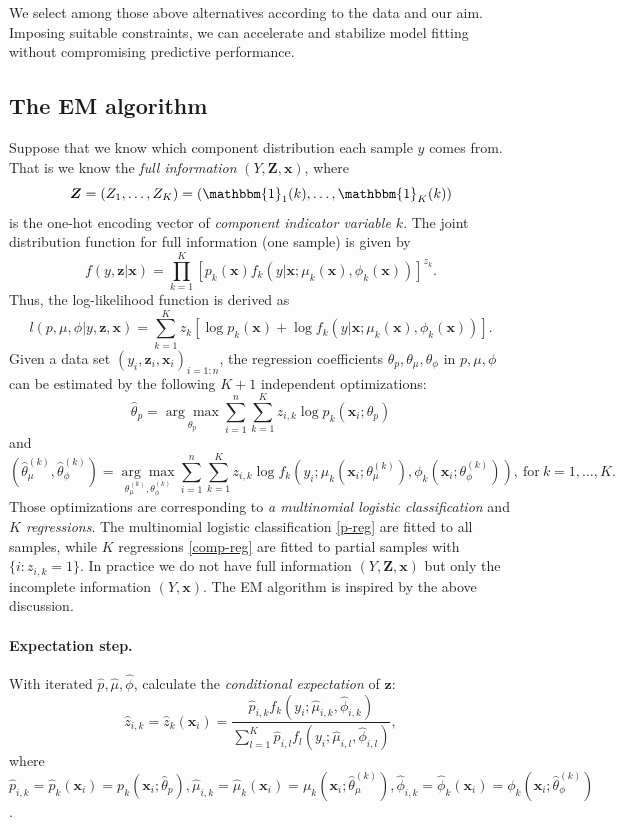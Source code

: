 \documentclass[11pt]{article}
\numberwithin{equation}{section}
\def\bx{\boldsymbol{x}}
\def\bZ{\boldsymbol{Z}}
\def\bz{\boldsymbol{z}}
\begin{document}
	We select among those above alternatives according to the data and our aim. 
	Imposing suitable constraints, we can {accelerate and stabilize model fitting} without compromising predictive performance.

\subsection{The EM algorithm}

	Suppose that we know which component distribution each sample $y$ comes from. That is we know the \textit{full information} $(Y,\bZ,\bx)$, where
	$$\bZ=(Z_1,\ldots,Z_K)=(\mathbbm{1}_1(k),\ldots,\mathbbm{1}_K(k))$$
	is the one-hot encoding vector of \textit{component indicator variable $k$}.
	The joint distribution function for full information (one sample) is given by
	$$f(y,\bz|
	\bx) = \prod_{k=1}^K\left[p_k(\bx)f_k(y|\bx;\mu_k(\bx),\phi_k(\bx))\right]^{z_k}.$$
	Thus, the {log-likelihood function} is derived as
	\begin{equation}\label{full-L}
		l(p,\mu,\phi|y,\bz,\bx)=\sum_{k=1}^K z_k\left[\log p_k(\bx) + \log f_k(y|\bx;\mu_k(\bx),\phi_k(\bx))\right].
	\end{equation}
	Given a data set $(y_i,\bz_i,\bx_i)_{i=1:n}$, the regression coefficients $\theta_p, \theta_\mu, \theta_\phi$ in $p,\mu,\phi$ can be estimated by the following $K+1$ {independent optimizations:}
	\begin{equation}\label{p-reg}
		\hat{\theta}_p=\underset{\theta_p}{\arg\max}\sum_{i=1}^n\sum_{k=1}^Kz_{i,k}\log p_k(\bx_i;\theta_p)
	\end{equation}
and
	\begin{equation}\label{comp-reg}
		\left(\hat{\theta}_\mu^{(k)},\hat{\theta}_\phi^{(k)}\right)=\underset{\theta^{(k)}_\mu,\theta^{(k)}_\phi}{\arg\max}\sum_{i=1}^n\sum_{k=1}^Kz_{i,k}\log f_k\left(y_i;\mu_k\left(\bx_i;\theta_\mu^{(k)}\right),\phi_k\left(\bx_i;\theta_\phi^{(k)}\right)\right), ~\text{for} ~ k=1,\ldots,K.
	\end{equation}
	Those optimizations are corresponding to  {\it a multinomial logistic classification} and {\it $K$ regressions}.
The multinomial logistic classification \eqref{p-reg} are fitted to all samples, while $K$ regressions \eqref{comp-reg} are fitted to {partial} samples with $\{i:z_{i,k}=1\}$.
In practice we do not have full information  $(Y,\bZ,\bx)$ but only the incomplete information $(Y,\bx)$. The  EM algorithm is inspired by the above discussion.
\paragraph{Expectation step.}
	With iterated $\hat{p},\hat{\mu},\hat{\phi}$, calculate the \textit{conditional expectation} of $\bz$:
	$$\hat{z}_{i,k}=\hat{z}_k(\bx_i)=\frac{\hat{p}_{i,k}f_k(y_i;\hat{\mu}_{i,k},\hat{\phi}_{i,k})}{\sum_{l=1}^K\hat{p}_{i,l}f_l(y_i;\hat{\mu}_{i,l},\hat{\phi}_{i,l})},$$
	where
	$\hat{p}_{i,k}=\hat{p}_k(\bx_i)= p_k(\bx_i;\hat{\theta}_p),\hat{\mu}_{i,k}=\hat{\mu}_k(\bx_i)=\mu_k\left(\bx_i;\hat{\theta}_\mu^{(k)}\right),\hat{\phi}_{i,k}=\hat{\phi}_k(\bx_i)=\phi_k\left(\bx_i;\hat{\theta}_\phi^{(k)}\right)$.
\end{document}

